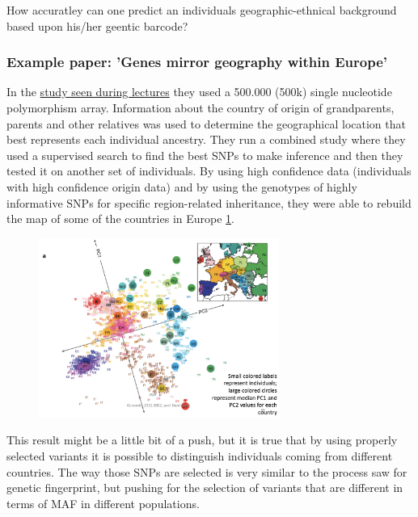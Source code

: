 How accuratley can one predict an individuals geographic-ethnical background
based upon his/her geentic barcode?

\subsubsection{Example paper: 'Genes mirror geography within Europe'}

In the \href{https://www.ncbi.nlm.nih.gov/pmc/articles/PMC2735096/}{study seen
during lectures} they used a 500.000 (500k) single nucleotide polymorphism
array. Information about the country of origin of grandparents, parents and
other relatives was used to determine the geographical location that best
represents each individual ancestry. They run a combined study where they used a
supervised search to find the best SNPs to make inference and then they tested
it on another set of individuals. By using high confidence data (individuals
with high confidence origin data) and by using the genotypes of highly
informative SNPs for specific region-related inheritance, they were able to
rebuild the map of some of the countries in Europe \ref{fig:PCA_countries}. 

\begin{figure}
	\centering
	\includegraphics[width=0.7\textwidth]{PCA.PNG}
	\caption{\label{fig:PCA_countries}}
\end{figure}

This result might be a little bit of a push, but it is true that by using
properly selected variants it is possible to distinguish individuals coming from
different countries. The way those SNPs are selected is very similar to the
process saw for genetic fingerprint, but pushing for the selection of variants
that are different in terms of MAF in different populations. 

